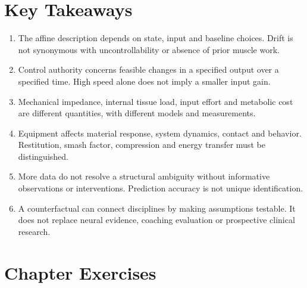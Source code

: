 \section{Key Takeaways}
\label{princ:ch13:takeaways}

\begin{enumerate}[leftmargin=*]
\item The affine description depends on state, input and baseline choices. Drift is not synonymous with uncontrollability or absence of prior muscle work.
\item Control authority concerns feasible changes in a specified output over a specified time. High speed alone does not imply a smaller input gain.
\item Mechanical impedance, internal tissue load, input effort and metabolic cost are different quantities, with different models and measurements.
\item Equipment affects material response, system dynamics, contact and behavior. Restitution, smash factor, compression and energy transfer must be distinguished.
\item More data do not resolve a structural ambiguity without informative observations or interventions. Prediction accuracy is not unique identification.
\item A counterfactual can connect disciplines by making assumptions testable. It does not replace neural evidence, coaching evaluation or prospective clinical research.
\end{enumerate}

\section{Chapter Exercises}
\label{exercises:ch13}

